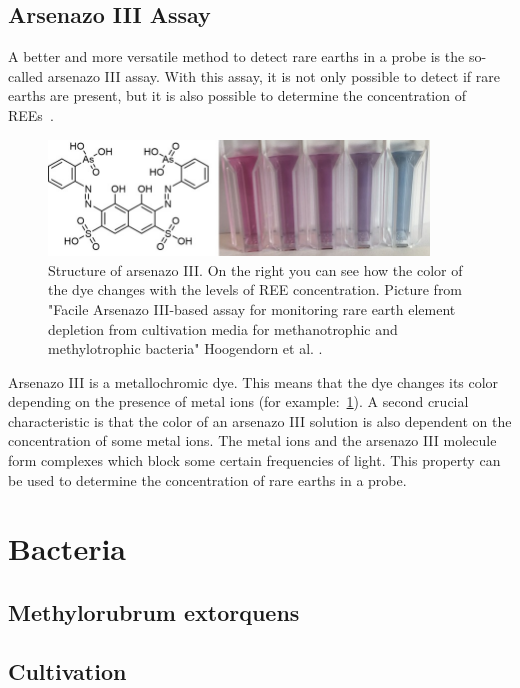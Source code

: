 \subsection{Arsenazo III Assay}
A better and more versatile method to detect rare earths in a probe is the so-called arsenazo III assay.
With this assay, it is not only possible to detect if rare earths are present, but it is also possible to determine the concentration of REEs~\cite{arsenazo3assay}.

\begin{figure}[H]
    \centering
    \includegraphics[width=0.9\textwidth]{media/images/arsenazo3_structure_example}
    \caption{Structure of arsenazo III. On the right you can see how the color of the dye changes with the levels of REE concentration. Picture from "Facile Arsenazo III-based assay for monitoring rare earth element depletion from cultivation media for methanotrophic and methylotrophic bacteria" Hoogendorn et al. \cite{arsenazo3assay}.}
    \label{fig:arsenazo3}
\end{figure}

Arsenazo III is a metallochromic dye.
This means that the dye changes its color depending on the presence of metal ions (for example:~\ref{fig:arsenazo3}).
A second crucial characteristic is that the color of an arsenazo III solution is also dependent on the concentration of some metal ions.
The metal ions and the arsenazo III molecule form complexes which block some certain frequencies of light.
This property can be used to determine the concentration of rare earths in a probe.


\section{Bacteria\authorB{}}

\subsection{Methylorubrum extorquens}

\subsection{Cultivation}


